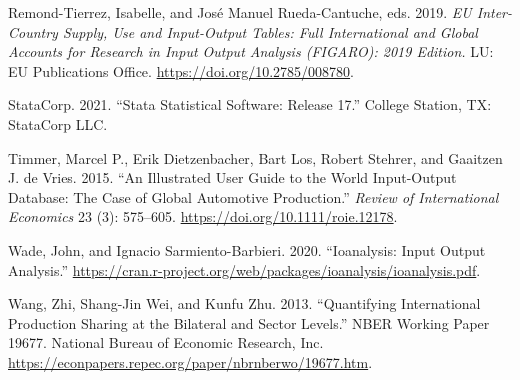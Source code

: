 \begin{CSLReferences}{1}{0}
\leavevmode{}%
Remond-Tierrez, Isabelle, and José Manuel Rueda-Cantuche, eds. 2019. \emph{{EU} Inter-Country Supply, Use and Input-Output Tables: Full International and Global Accounts for Research in Input Output Analysis ({FIGARO}): 2019 Edition.} LU: EU Publications Office. \url{https://doi.org/10.2785/008780}.

\leavevmode{}%
StataCorp. 2021. {``Stata {Statistical} {Software}: {Release} 17.''} College Station, TX: StataCorp LLC.

\leavevmode{}%
Timmer, Marcel P., Erik Dietzenbacher, Bart Los, Robert Stehrer, and Gaaitzen J. de Vries. 2015. {``An {Illustrated} {User} {Guide} to the {World} {Input}-{Output} {Database}: The {Case} of {Global} {Automotive} {Production}.''} \emph{Review of International Economics} 23 (3): 575--605. \url{https://doi.org/10.1111/roie.12178}.

\leavevmode{}%
Wade, John, and Ignacio Sarmiento-Barbieri. 2020. {``Ioanalysis: {Input} {Output} {Analysis}.''} \url{https://cran.r-project.org/web/packages/ioanalysis/ioanalysis.pdf}.

\leavevmode{}%
Wang, Zhi, Shang-Jin Wei, and Kunfu Zhu. 2013. {``Quantifying {International} {Production} {Sharing} at the {Bilateral} and {Sector} {Levels}.''} NBER Working Paper 19677. National Bureau of Economic Research, Inc. \url{https://econpapers.repec.org/paper/nbrnberwo/19677.htm}.

\end{CSLReferences}


\address{%
Enrique Feás\\
Universidad de Alcalá and Elcano Royal Institute\\%
Universidad de Alcalá, Pl. de San Diego, s/n, 28801 Alcalá de Henares, Madrid, Spain\\ Elcano Royal Institute, Calle del Príncipe de Vergara, 51. 28006 Madrid, Spain\\
%
%
\textit{ORCiD: \href{https://orcid.org/0000-0002-9431-6051}{0000-0002-9431-6051}}\\%
\href{mailto:enrique.feas@edu.uah.es}{\nolinkurl{enrique.feas@edu.uah.es}}, \href{mailto:efeas@rielcano.org}{\nolinkurl{efeas@rielcano.org}}%
}
